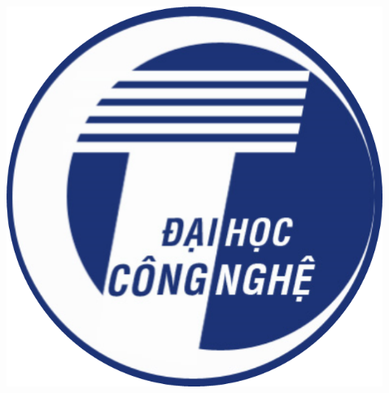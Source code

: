 \documentclass[%
  final,%
  english,%
]{beamer}
\begin{document}
\begin{frame}[t, fragile = singleslide]

\begin{columns}[t, onlytextwidth]%
%

\begin{column}{0.1\textwidth}
\begin{flushleft}
\includegraphics[width = \columnwidth]{./Logos/UET-logo.png}
\end{flushleft}
\end{column}
%
\begin{column}{0.8\textwidth}
\titlepage%
\end{column}
%
\begin{column}{0.1\textwidth}
\begin{flushright}

\end{flushright}
\end{column}
\end{columns}
\end{frame}
\end{document}
